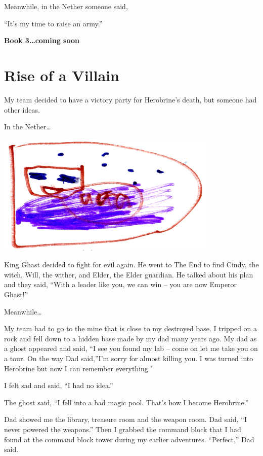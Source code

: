 \documentclass[12pt,oneside]{krantz}
\begin{document}
Meanwhile, in the Nether someone said,

``It's my time to raise an army.''

\textbf{Book 3\ldots{}coming soon}

\hypertarget{rise-of-a-villain}{%
\chapter{Rise of a Villain}\label{rise-of-a-villain}}

My team decided to have a victory party for Herobrine's death, but
someone had other ideas.

In the Nether\ldots{}

\includegraphics[width=4.16667in,height=\textheight]{img/king-ghast/03-aaa.jpg}

King Ghast decided to fight for evil again. He went to The End to find
Cindy, the witch, Will, the wither, and Elder, the Elder guardian. He
talked about his plan and they said, ``With a leader like you, we can
win -- you are now Emperor Ghast!''

Meanwhile\ldots{}

My team had to go to the mine that is close to my destroyed base. I
tripped on a rock and fell down to a hidden base made by my dad many
years ago. My dad as a ghost appeared and said, ``I see you found my lab
-- come on let me take you on a tour. On the way Dad said,''I'm sorry
for almost killing you. I was turned into Herobrine but now I can
remember everything."

I felt sad and said, ``I had no idea.''

The ghost said, ``I fell into a bad magic pool. That's how I become
Herobrine.''

Dad showed me the library, treasure room and the weapon room. Dad said,
``I never powered the weapons.'' Then I grabbed the command block that I
had found at the command block tower during my earlier adventures.
``Perfect,'' Dad said.
\end{document}
